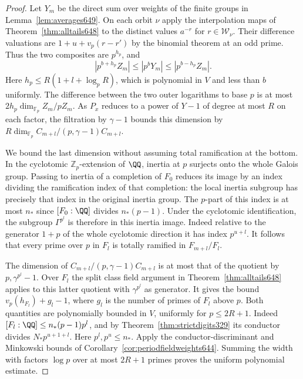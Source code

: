 \documentclass[a4paper,11pt]{article}
\theoremstyle{definition}
\theoremstyle{remark}
\newcommand{\ZZ}{\mathbb Z}\newcommand{\ord}{\operatorname{ord}}
\numberwithin{equation}{section}
\begin{document}
\begin{proof}
Let \(Y_m\) be the direct sum over weights of the finite
groups in Lemma~\ref{lem:averages649}. On each orbit \(\nu\)
apply the interpolation maps of Theorem~\ref{thm:alltails648}
to the distinct values \(a^{-r}\) for \(r\in\mathcal W_\nu\).
Their difference valuations are \(1+u+v_p(r-r')\) by the
binomial theorem at an odd prime. Thus the two composites
are \(p^{h_p}\), and
\[
                  |p^{b+h_p}Z_m|\le |p^bY_m|
                                      \le |p^{b-h_p}Z_m|.
\]
Here \(h_p\le R(1+l+\log_p R)\), which is polynomial in
\(V\) and less than \(b\) uniformly. The difference between
the two outer logarithms to base \(p\) is at most
\(2h_p\dim_{\mathbb F_p}Z_m/pZ_m\).
As \(P_x\) reduces to a power of \(Y-1\) of degree at most
\(R\) on each factor, the filtration by \(\gamma-1\) bounds
this dimension by \(R\dim_{\mathbb F_p}
C_{m+l}/(p,\gamma-1)C_{m+l}\).

We bound the last dimension without assuming total
ramification at the bottom. In the cyclotomic
\(\ZZ_p\)-extension of \(\QQ\), inertia at \(p\) surjects
onto the whole Galois group. Passing to inertia of a
completion of \(F_0\) reduces its image by an index dividing
the ramification index of that completion: the local
inertia subgroup has precisely that index in the original
inertia group. The \(p\)-part of this index is at most
\(n_*\) since \([F_0:\QQ]\) divides \(n_*(p-1)\).
Under the cyclotomic identification, the subgroup
\(\Gamma^{p^l}\) is therefore in this inertia image.
Indeed relative to the generator \(1+p\) of the whole
cyclotomic direction it has index \(p^{u+l}\).
It follows that every prime over \(p\) in \(F_l\) is totally
ramified in \(F_{m+l}/F_l\).

The dimension of \(C_{m+l}/(p,\gamma-1)C_{m+l}\) is at
most that of the quotient by \(p,\gamma^{p^l}-1\).
Over \(F_l\) the split class field argument in
Theorem~\ref{thm:alltails648} applies to this latter
quotient with \(\gamma^{p^l}\) as generator. It gives
the bound \(v_p(h_{F_l})+g_l-1\), where \(g_l\) is the
number of primes of \(F_l\) above \(p\). Both quantities
are polynomially bounded in \(V\), uniformly for
\(p\le2R+1\). Indeed
\([F_l:\QQ]\le n_*(p-1)p^l\), and by
Theorem~\ref{thm:strictdigits329} its conductor divides
\(N_*p^{u+1+l}\). Here \(p^l,p^u\le n_*\).
Apply the conductor-discriminant and Minkowski bounds of
Corollary~\ref{cor:periodfieldweights644}. Summing the
width with factors \(\log p\) over at most \(2R+1\) primes
proves the uniform polynomial estimate.


\end{proof}
\end{document}
